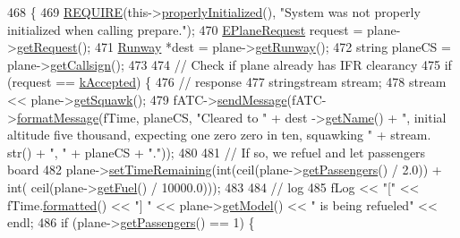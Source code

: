 \begin{DoxyCode}
468                                                    \{
469     \hyperlink{DesignByContract_8h_aeb774672b46dbe80afc14e0d1970f017}{REQUIRE}(this->\hyperlink{classSystem_af3eece83ba2d92a4a6b6c186d427c556}{properlyInitialized}(), \textcolor{stringliteral}{"System was not properly initialized
       when calling prepare."});
470     \hyperlink{Airplane_8h_a4a8a3f45932bdf601f093bea061bad9b}{EPlaneRequest} request = plane->\hyperlink{classAirplane_afe210aea9002a8975234a78350158c46}{getRequest}();
471     \hyperlink{classRunway}{Runway} *dest = plane->\hyperlink{classAirplane_ab6dda72f7cfd29a7334e0494d184bbfa}{getRunway}();
472     \textcolor{keywordtype}{string} planeCS = plane->\hyperlink{classAirplane_a6a62bd06d28789336c5ce1543d9391f1}{getCallsign}();
473 
474     \textcolor{comment}{// Check if plane already has IFR clearancy}
475     \textcolor{keywordflow}{if} (request == \hyperlink{Airplane_8h_a4a8a3f45932bdf601f093bea061bad9ba15597ea7f444a937d40b39b9ea99dd1d}{kAccepted}) \{
476         \textcolor{comment}{// response}
477         stringstream stream;
478         stream << plane->\hyperlink{classAirplane_a88f0199d7eae4d1f24b14802047549ea}{getSquawk}();
479         fATC->\hyperlink{classATC_aa78b32354d28f3f2eac0143df617283b}{sendMessage}(fATC->\hyperlink{classATC_a2fca67fc154c7d8a6c14198697653059}{formatMessage}(fTime, planeCS, \textcolor{stringliteral}{"Cleared to "} + dest
      ->\hyperlink{classRunway_a2934c38f3af6080f7b40c306a27c57cd}{getName}() + \textcolor{stringliteral}{", initial altitude five thousand, expecting one zero zero in ten, squawking "} + stream.
      str() + \textcolor{stringliteral}{", "} + planeCS + \textcolor{stringliteral}{"."}));
480 
481         \textcolor{comment}{// If so, we refuel and let passengers board}
482         plane->\hyperlink{classAirplane_a43e7b856df001168956ed6d115943ec9}{setTimeRemaining}(\textcolor{keywordtype}{int}(ceil(plane->\hyperlink{classAirplane_acd0cbb46d1c8a17a5eb4f5ab679f2dcb}{getPassengers}() / 2.0)) + \textcolor{keywordtype}{int}(
      ceil(plane->\hyperlink{classAirplane_a23170e5f55fa9fc6822be06615f028db}{getFuel}() / 10000.0)));
483 
484         \textcolor{comment}{// log}
485         fLog << \textcolor{stringliteral}{"["} << fTime.\hyperlink{classTime_aeeb2d2b5a624d0d78b7f5d146d0682f5}{formatted}() << \textcolor{stringliteral}{"] "} << plane->\hyperlink{classAirplane_ab3086ab630a7e427df70c7b45f11dd82}{getModel}() << \textcolor{stringliteral}{" is being
       refueled"} << endl;
486         \textcolor{keywordflow}{if} (plane->\hyperlink{classAirplane_acd0cbb46d1c8a17a5eb4f5ab679f2dcb}{getPassengers}() == 1) \{

\end{DoxyCode}
